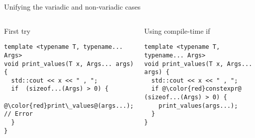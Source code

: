\begin{frame}[t,fragile]{Unifying the variadic and non-variadic cases}

\begin{columns}[T]

\pause
{}
\begin{block}{First try}
\begin{lstlisting}[escapechar=@]
template <typename T, typename... Args>
void print_values(T x, Args... args) {
  std::cout << x << " , ";
  if  (sizeof...(Args) > 0) { 
    @\color{red}print\_values@(args...); // Error
  }
}
\end{lstlisting}
\end{block}

\pause
{}
\begin{block}{Using compile-time if}
\begin{lstlisting}[escapechar=@]
template <typename T, typename... Args>
void print_values(T x, Args... args) {
  std::cout << x << " , ";
  if @\color{red}constexpr@ (sizeof...(Args) > 0) { 
    print_values(args...); 
  }
}
\end{lstlisting}
\end{block}
\end{columns}
\end{frame}
